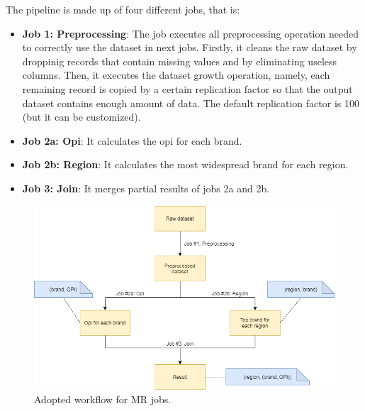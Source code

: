 The pipeline is made up of four different jobs, that is:
\begin{itemize}
  \item \textbf{Job 1: Preprocessing}: The job executes all preprocessing operation needed to correctly use the dataset in next jobs. Firstly, it cleans the raw dataset by droppinig records that contain missing values and by eliminating useless columns. Then, it executes the dataset growth operation, namely, each remaining record is copied by a certain replication factor so that the output dataset contains enough amount of data. The default replication factor is 100 (but it can be customized).  
  \item \textbf{Job 2a: Opi}: It calculates the opi for each brand.
  \item \textbf{Job 2b: Region}: It calculates the most widespread brand for each region.
  \item \textbf{Job 3: Join}: It merges partial results of jobs 2a and 2b.
\end{itemize}

\begin{figure}[H]
	\centering
	\includegraphics[scale=0.6]{images/2-mapreduce/MR-workflow.png}
	\caption{Adopted workflow for MR jobs.}
	\label{fig:MR-workflow}
\end{figure}



